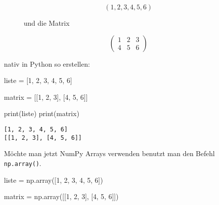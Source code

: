 \documentclass[
  letterpaper,
  DIV=11,
  numbers=noendperiod]{scrreprt}
\newenvironment{Shaded}{\begin{snugshade}}{\end{snugshade}}
\newcommand{\BuiltInTok}[1]{\textcolor[rgb]{0.00,0.23,0.31}{#1}}
\newcommand{\DecValTok}[1]{\textcolor[rgb]{0.68,0.00,0.00}{#1}}
\newcommand{\NormalTok}[1]{\textcolor[rgb]{0.00,0.23,0.31}{#1}}
\newcommand{\OperatorTok}[1]{\textcolor[rgb]{0.37,0.37,0.37}{#1}}
\begin{document}
\begin{tcolorbox}
\begin{figure}

\begin{minipage}{0.33\linewidth}
\[
(1, 2, 3, 4, 5, 6) 
\]\end{minipage}%
%
\begin{minipage}{0.33\linewidth}
und die Matrix\end{minipage}%
%
\begin{minipage}{0.33\linewidth}
\[
\begin{pmatrix}
1 & 2 & 3\\
4 & 5 & 6
\end{pmatrix}
\]\end{minipage}%

\end{figure}%

nativ in Python so erstellen:

\begin{Shaded}
\begin{Highlighting}[]
\NormalTok{liste }\OperatorTok{=}\NormalTok{ [}\DecValTok{1}\NormalTok{, }\DecValTok{2}\NormalTok{, }\DecValTok{3}\NormalTok{, }\DecValTok{4}\NormalTok{, }\DecValTok{5}\NormalTok{, }\DecValTok{6}\NormalTok{]}

\NormalTok{matrix }\OperatorTok{=}\NormalTok{ [[}\DecValTok{1}\NormalTok{, }\DecValTok{2}\NormalTok{, }\DecValTok{3}\NormalTok{], [}\DecValTok{4}\NormalTok{, }\DecValTok{5}\NormalTok{, }\DecValTok{6}\NormalTok{]]}

\BuiltInTok{print}\NormalTok{(liste)}
\BuiltInTok{print}\NormalTok{(matrix)}
\end{Highlighting}
\end{Shaded}

\begin{verbatim}
[1, 2, 3, 4, 5, 6]
[[1, 2, 3], [4, 5, 6]]
\end{verbatim}

Möchte man jetzt NumPy Arrays verwenden benutzt man den Befehl
\texttt{np.array()}.

\begin{Shaded}
\begin{Highlighting}[]
\NormalTok{liste }\OperatorTok{=}\NormalTok{ np.array([}\DecValTok{1}\NormalTok{, }\DecValTok{2}\NormalTok{, }\DecValTok{3}\NormalTok{, }\DecValTok{4}\NormalTok{, }\DecValTok{5}\NormalTok{, }\DecValTok{6}\NormalTok{])}

\NormalTok{matrix }\OperatorTok{=}\NormalTok{ np.array([[}\DecValTok{1}\NormalTok{, }\DecValTok{2}\NormalTok{, }\DecValTok{3}\NormalTok{], [}\DecValTok{4}\NormalTok{, }\DecValTok{5}\NormalTok{, }\DecValTok{6}\NormalTok{]])}


\end{Highlighting}
\end{Shaded}
\end{tcolorbox}
\end{document}
